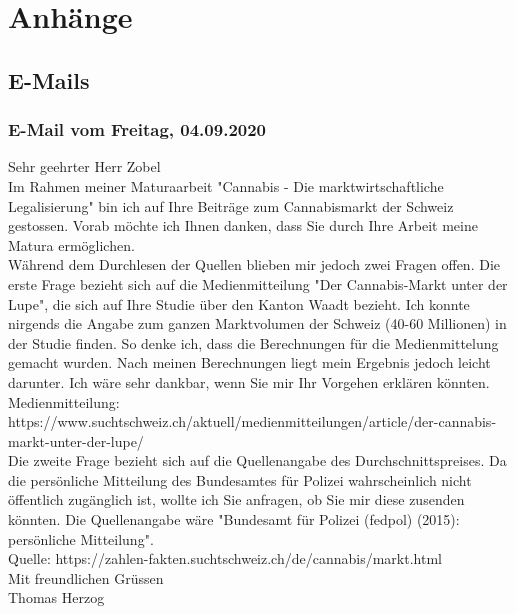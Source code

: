 \documentclass[../main.tex]{subfiles}
\begin{document}
	\section{Anhänge}
	
	\subsection{E-Mails}
	
	\subsubsection{E-Mail vom Freitag, 04.09.2020}
	\hypertarget{Attachment-1.1}{}
	\begin{tcolorbox}[title=Thomas Herzog $\to$ Frank Zobel]
		\scriptsize Sehr geehrter Herr Zobel\\

		Im Rahmen meiner Maturaarbeit "Cannabis - Die marktwirtschaftliche Legalisierung" bin ich auf Ihre Beiträge zum Cannabismarkt der Schweiz gestossen. Vorab möchte ich Ihnen danken, dass Sie durch Ihre Arbeit meine Matura ermöglichen.\\

		Während dem Durchlesen der Quellen blieben mir jedoch zwei Fragen offen. Die erste Frage bezieht sich auf die Medienmitteilung "Der Cannabis-Markt unter der Lupe", die sich auf Ihre Studie über den Kanton Waadt bezieht. Ich konnte nirgends die Angabe zum ganzen Marktvolumen der Schweiz (40-60 Millionen) in der Studie finden. So denke ich, dass die Berechnungen für die Medienmittelung gemacht wurden. Nach meinen Berechnungen liegt mein Ergebnis jedoch leicht darunter. Ich wäre sehr dankbar, wenn Sie mir Ihr Vorgehen erklären könnten.\\

		Medienmitteilung: \\
		https://www.suchtschweiz.ch/aktuell/medienmitteilungen/article/der-cannabis-markt-unter-der-lupe/\\

		Die zweite Frage bezieht sich auf die Quellenangabe des Durchschnittspreises. Da die persönliche Mitteilung des Bundesamtes für Polizei wahrscheinlich nicht öffentlich zugänglich ist, wollte ich Sie anfragen, ob Sie mir diese zusenden könnten. Die Quellenangabe wäre "Bundesamt für Polizei (fedpol) (2015): persönliche Mitteilung".\\

		Quelle:	https://zahlen-fakten.suchtschweiz.ch/de/cannabis/markt.html\\


		Mit freundlichen Grüssen\\
		Thomas Herzog
	\end{tcolorbox}
	
\end{document}

